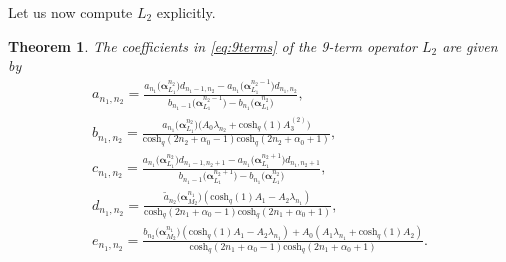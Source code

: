 \documentclass[10pt,a4paper]{amsart}
\numberwithin{equation}{section}
\newtheorem{Theorem}{Theorem}[section]
\newcommand{\chq}{\mathrm{cosh}_q}
\begin{document}
Let us now compute $L_2$ explicitly.
\begin{Theorem}The coefficients in \eqref{eq:9terms} of the 9-term operator $L_2$ are given by
	\begin{gather*}
		a_{n_1,n_2} = \frac{a_{n_1}\big(\bm{\alpha}_{L_1}^{n_2}\big)d_{n_1-1,n_2}-a_{n_1}\big(\bm{\alpha}_{L_1}^{n_2-1}\big)d_{n_1,n_2}} {b_{n_1-1}\big(\bm{\alpha}_{L_1}^{n_2-1}\big)-b_{n_1}\big(\bm{\alpha}_{L_1}^{n_2}\big)} ,\\ %
		b_{n_1,n_2} = \frac{a_{n_1}\big(\bm{\alpha}_{L_1}^{n_2}\big)\big(A_0\lambda_{n_2} +\chq(1)A_3^{(2)}\big)}{\chq(2n_2+\alpha_0-1)\chq(2n_2+\alpha_0+1)} ,\\
		c_{n_1,n_2} = \frac{a_{n_1}\big(\bm{\alpha}_{L_1}^{n_2}\big)d_{n_1-1,n_2+1}-a_{n_1}\big(\bm{\alpha}_{L_1}^{n_2+1}\big)d_{n_1,n_2+1}}{b_{n_1-1}\big(\bm{\alpha}_{L_1}^{n_2+1}\big) -b_{n_1}\big(\bm{\alpha}_{L_1}^{n_2}\big)} ,\\
d_{n_1,n_2} =\frac{\tilde{a}_{n_2}\big(\bm{\alpha}_{M_2}^{n_1}\big) (\chq(1)A_1-A_2\lambda_{n_1} )}{\chq(2n_1+\alpha_0-1)\chq(2n_1+\alpha_0+1)} ,\\
e_{n_1,n_2} =\frac{b_{n_2}\big(\bm{\alpha}_{M_2}^{n_1}\big) (\chq(1)A_1-A_2\lambda_{n_1})+A_0(A_1\lambda_{n_1}+\chq(1)A_2 )}{\chq(2n_1+\alpha_0-1)\chq(2n_1+\alpha_0+1)} .%
	\end{gather*}
\end{Theorem}
\end{document}
